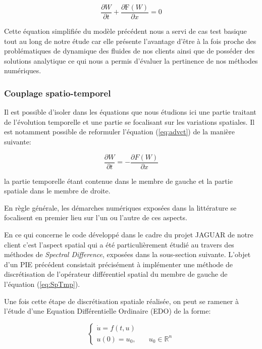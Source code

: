 \begin{equation} 
    \frac{\partial W}{\partial t}+\frac{\partial \mathrm{F}(W)}{\partial x}=0
    \label{eq:advct}
\end{equation}

Cette équation simplifiée du modèle précédent nous a servi de cas test basique tout au long de notre étude car elle présente l'avantage d'être à la fois proche des problématiques de dynamique des fluides de nos clients ainsi que de posséder des solutions analytique ce qui nous a permis d'évaluer la pertinence de nos méthodes numériques.
\subsubsection{Couplage spatio-temporel}
Il est possible d'isoler dans les équations que nous étudions ici une partie traitant de l'évolution temporelle et une partie se focalisant sur les variations spatiales. Il est notamment possible de reformuler l'équation (\ref{eq:advct}) de la manière suivante:

\begin{equation}
\frac{\partial W}{\partial t} = -\frac{\partial F(W)}{\partial x}
\label{eq:SpTmp}
\end{equation}

la partie temporelle étant contenue dans le membre de gauche et la partie spatiale dans le membre de droite.

En règle générale, les démarches numériques exposées dans la littérature se focalisent en premier lieu sur l'un ou l'autre de ces aspects.

En ce qui concerne le code développé dans le cadre du projet JAGUAR de notre client c'est l'aspect spatial qui a été particulièrement étudié au travers des méthodes de \emph{Spectral Difference}, exposées dans la sous-section suivante. L'objet d'un PIE précédent consistait précisément à implémenter une méthode de discrétisation de l'opérateur différentiel spatial du membre de gauche de l'équation (\ref{eq:SpTmp}).

Une fois cette étape de discrétisation spatiale réalisée, on peut se ramener à l'étude d'une Equation Différentielle Ordinaire (EDO) de la forme:

\begin{equation}
\left\{
    \begin{aligned}
    \dot{u} = f(t,u)&\\
    u(0) = u_0, &\quad u_0\in \mathbb{R}^n
    \end{aligned}
    \right.
    \label{eq:EDO}
\end{equation}

